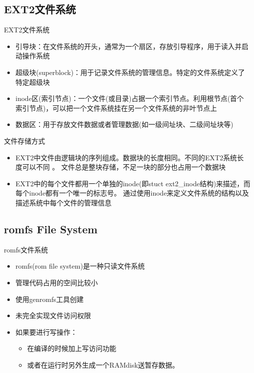 \subsection{EXT2文件系统}
\begin{frame}{EXT2文件系统}
\begin{itemize}
\item 引导块：在文件系统的开头，通常为一个扇区，存放引导程序，用于读入并启动操作系统
\item 超级块(superblock)：用于记录文件系统的管理信息。特定的文件系统定义了特定超级块
\item inode区(索引节点)：一个文件(或目录)占据一个索引节点。利用根节点(首个索引节点)，可以把一个文件系统挂在另一个文件系统的非叶节点上
\item 数据区：用于存放文件数据或者管理数据(如一级间址块、二级间址块等)
\end{itemize}
\end{frame}

\begin{frame}{文件存储方式}
\begin{itemize}
\item EXT2中文件由逻辑块的序列组成。数据块的长度相同。不同的EXT2系统长度可以不同 。 文件总是整块存储，不足一块的部分也占用一个数据块
\item EXT2中的每个文件都用一个单独的inode(即stuct ext2\_inode结构)来描述，而每个inode都有一个唯一的标志号。 通过使用inode来定义文件系统的结构以及描述系统中每个文件的管理信息
\end{itemize}
\end{frame}


\subsection{romfs File System}
\begin{frame}{romfs文件系统}
\begin{itemize}
\item romfs(rom file system)是一种只读文件系统
\item 管理代码占用的空间比较小
\item 使用genromfs工具创建
\item 未完全实现文件访问权限
\item 如果要进行写操作：
\begin{itemize}
\item 在编译的时候加上写访问功能
\item 或者在运行时另外生成一个RAMdisk送暂存数据。
\end{itemize}
\end{itemize}
\end{frame}

